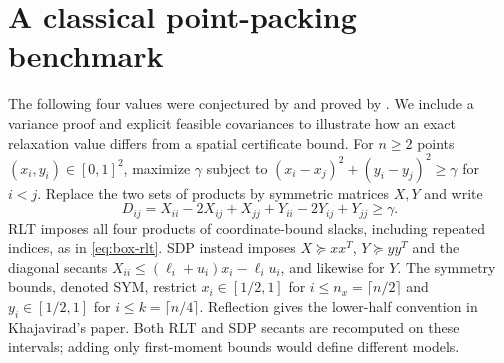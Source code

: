 \section{A classical point-packing benchmark}\label{app:point-packing}
The following four values were conjectured by \citet[Section 4]{Anstreicher2009}
and proved by \citet[Propositions 1(i--ii) and 3]{Khajavirad2024}.
We include a variance proof and explicit feasible covariances to illustrate
how an exact relaxation value differs from a spatial certificate bound.
For $n\ge2$ points $(x_i,y_i)\in[0,1]^2$, maximize $\gamma$ subject to
$(x_i-x_j)^2+(y_i-y_j)^2\ge\gamma$ for $i<j$. Replace the two sets of
products by symmetric matrices $X,Y$ and write
\[
 D_{ij}=X_{ii}-2X_{ij}+X_{jj}+Y_{ii}-2Y_{ij}+Y_{jj}\ge\gamma.
\]
RLT imposes all four products of coordinate-bound slacks, including
repeated indices, as in \eqref{eq:box-rlt}. SDP instead imposes
$X\succeq xx^T$, $Y\succeq yy^T$ and the diagonal secants
$X_{ii}\le(\ell_i+u_i)x_i-\ell_i u_i$, and likewise for $Y$.
The symmetry bounds, denoted SYM, restrict $x_i\in[1/2,1]$ for
$i\le n_x=\lceil n/2\rceil$ and $y_i\in[1/2,1]$ for
$i\le k=\lceil n/4\rceil$. Reflection gives the lower-half convention
in Khajavirad's paper. Both RLT and SDP secants are recomputed on these
intervals; adding only first-moment bounds would define different models.

